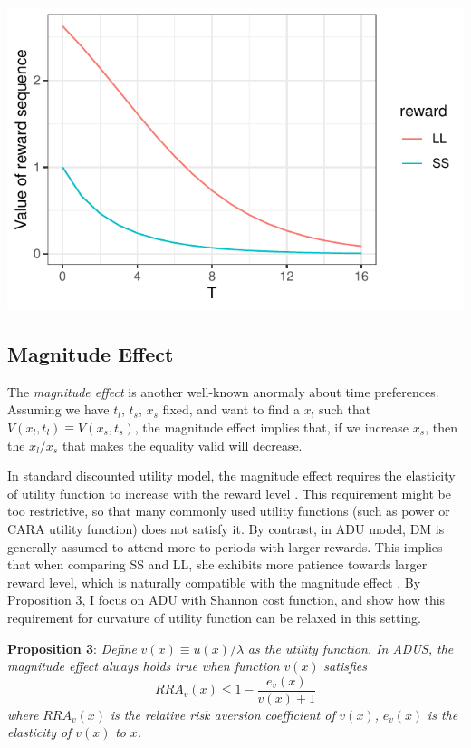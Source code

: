 \documentclass[
  12pt,
]{article}
\begin{document}
\includegraphics{images/value_LLvSS.pdf}

\hypertarget{magnitude-effect}{%
\subsection{Magnitude Effect}\label{magnitude-effect}}

The \emph{magnitude effect} is another well-known anormaly about time
preferences. Assuming we have \(t_l\), \(t_s\), \(x_s\) fixed, and want
to find a \(x_l\) such that \(V(x_l,t_l) \equiv V(x_s,t_s)\), the
magnitude effect implies that, if we increase \(x_s\), then the
\(x_l/x_s\) that makes the equality valid will decrease.

In standard discounted utility model, the magnitude effect requires the
elasticity of utility function to increase with the reward level
\citep{loewenstein_anomalies_1992}. This requirement might be too
restrictive, so that many commonly used utility functions (such as power
or CARA utility function) does not satisfy it. By contrast, in ADU
model, DM is generally assumed to attend more to periods with larger
rewards. This implies that when comparing SS and LL, she exhibits more
patience towards larger reward level, which is naturally compatible with
the magnitude effect \citep{noor_intertemporal_2011, noor_optimal_2022}.
By Proposition 3, I focus on ADU with Shannon cost function, and show
how this requirement for curvature of utility function can be relaxed in
this setting.

\textbf{Proposition 3}: \emph{Define} \(v(x)\equiv u(x)/\lambda\)
\emph{as the utility function. In ADUS, the magnitude effect always
holds true when function} \(v(x)\) \emph{satisfies}\[
RRA_v(x)\leq 1-\frac{e_v(x)}{v(x)+1}
\]\emph{where} \(RRA_v(x)\) \emph{is the relative risk aversion
coefficient of} \(v(x)\)\emph{,} \(e_v(x)\) \emph{is the elasticity of}
\(v(x)\) \emph{to} \(x\)\emph{.}
\end{document}
